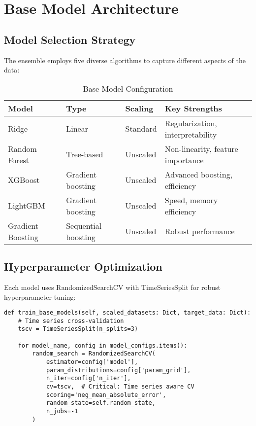\documentclass[12pt,a4paper]{article}
\begin{document}
\section{Base Model Architecture}

\subsection{Model Selection Strategy}

The ensemble employs five diverse algorithms to capture different aspects of the data:

\begin{table}[h]
\centering
\begin{tabular}{@{}llll@{}}
\toprule
\textbf{Model} & \textbf{Type} & \textbf{Scaling} & \textbf{Key Strengths} \\
\midrule
Ridge & Linear & Standard & Regularization, interpretability \\
Random Forest & Tree-based & Unscaled & Non-linearity, feature importance \\
XGBoost & Gradient boosting & Unscaled & Advanced boosting, efficiency \\
LightGBM & Gradient boosting & Unscaled & Speed, memory efficiency \\
Gradient Boosting & Sequential boosting & Unscaled & Robust performance \\
\bottomrule
\end{tabular}
\caption{Base Model Configuration}
\end{table}

\subsection{Hyperparameter Optimization}

Each model uses RandomizedSearchCV with TimeSeriesSplit for robust hyperparameter tuning:

\begin{lstlisting}[caption=Hyperparameter Optimization]
def train_base_models(self, scaled_datasets: Dict, target_data: Dict):
    # Time series cross-validation
    tscv = TimeSeriesSplit(n_splits=3)
    
    for model_name, config in model_configs.items():
        random_search = RandomizedSearchCV(
            estimator=config['model'],
            param_distributions=config['param_grid'],
            n_iter=config['n_iter'],
            cv=tscv,  # Critical: Time series aware CV
            scoring='neg_mean_absolute_error',
            random_state=self.random_state,
            n_jobs=-1
        )
\end{lstlisting}
\end{document}
